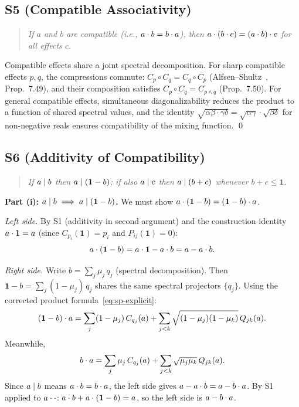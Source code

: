 \subsection*{S5 (Compatible Associativity)}

\begin{quote}
\emph{If $a$ and $b$ are compatible (i.e., $\sp{a}{b} = \sp{b}{a}$),
then $\sp{a}{(\sp{b}{c})} = \sp{(\sp{a}{b})}{c}$ for all effects $c$.}
\end{quote}

Compatible effects share a joint spectral decomposition. For sharp
compatible effects $p,q$, the compressions commute: $C_p \circ C_q = C_q
\circ C_p$ (Alfsen--Shultz~\cite{AlfsenShultz2003}, Prop.~7.49), and
their composition satisfies $C_p \circ C_q = C_{p \wedge q}$
(Prop.~7.50). For general compatible effects, simultaneous
diagonalizability reduces the product to a function of shared spectral
values, and the identity
$\sqrt{\alpha\beta\cdot\gamma\delta}
= \sqrt{\alpha\gamma}\cdot\sqrt{\beta\delta}$
for non-negative reals ensures compatibility of the mixing function. \qed

\subsection*{S6 (Additivity of Compatibility)}

\begin{quote}
\emph{If $a \compatible b$ then $a \compatible (\mathbf{1} - b)$; if
also $a \compatible c$ then $a \compatible (b + c)$ whenever
$b + c \le \mathbf{1}$.}
\end{quote}

\noindent\textbf{Part (i): $a \compatible b \implies a \compatible
(\mathbf{1} - b)$.}
We must show $\sp{a}{(\mathbf{1}-b)} = \sp{(\mathbf{1}-b)}{a}$.

\emph{Left side.} By S1 (additivity in second argument) and the
construction identity $\sp{a}{\mathbf{1}} = a$ (since
$C_{p_i}(\mathbf{1}) = p_i$ and $P_{ij}(\mathbf{1}) = 0$):
\[
  \sp{a}{(\mathbf{1}-b)} = \sp{a}{\mathbf{1}} - \sp{a}{b} = a - \sp{a}{b}.
\]

\emph{Right side.} Write $b = \sum_j \mu_j\, q_j$ (spectral decomposition).
Then $\mathbf{1} - b = \sum_j (1 - \mu_j)\, q_j$ shares the same spectral
projectors $\{q_j\}$. Using the corrected product
formula~\eqref{eq:sp-explicit}:
\[
  \sp{(\mathbf{1}-b)}{a}
  = \sum_j (1-\mu_j)\, C_{q_j}(a)
    + \sum_{j<k} \sqrt{(1-\mu_j)(1-\mu_k)}\, Q_{jk}(a).
\]
Meanwhile,
\[
  \sp{b}{a}
  = \sum_j \mu_j\, C_{q_j}(a)
    + \sum_{j<k} \sqrt{\mu_j\mu_k}\, Q_{jk}(a).
\]
Since $a \compatible b$ means $\sp{a}{b} = \sp{b}{a}$,
the left side gives $a - \sp{a}{b} = a - \sp{b}{a}$.
By S1 applied to $\sp{a}{\cdot}$:
$\sp{a}{b} + \sp{a}{(\mathbf{1}-b)} = a$, so the left side is
$a - \sp{b}{a}$.

